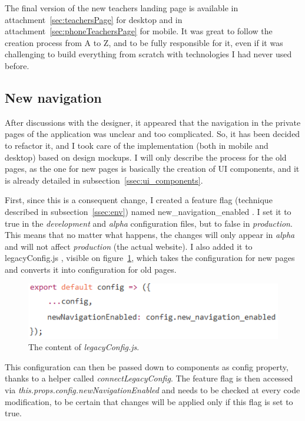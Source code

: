 The final version of the new teachers landing page is available in {\sc attachment}~\ref{sec:teachersPage} for desktop and in {\sc attachment}~\ref{sec:phoneTeachersPage} for mobile. It was great to follow the creation process from A to Z, and to be fully responsible for it, even if it was challenging to build everything from scratch with technologies I had never used before.

\subsection{New navigation}
\label{ssec:new_nav}

After discussions with the designer, it appeared that the navigation in the private pages of the application was unclear and too complicated. So, it has been decided to refactor it, and I took care of the implementation (both in mobile and desktop) based on design mockups. I will only describe the process for the old pages, as the one for new pages is basically the creation of UI components, and it is already detailed in {\sc subsection}~\ref{ssec:ui_components}.

First, since this is a consequent change, I created a feature flag (technique described in {\sc subsection}~\ref{ssec:env}) named \guillemotleft{} new\_navigation\_enabled \guillemotright{}. I set it to true in the \textit{development} and \textit{alpha} configuration files, but to false in \textit{production}. This means that no matter what happens, the changes will only appear in \textit{alpha} and will not affect \textit{production} (the actual website). I also added it to \guillemotleft{} legacyConfig.js \guillemotright{}, visible on {\sc figure}~\ref{fig:legacyConfig}, which takes the configuration for new pages and converts it into configuration for old pages.

\begin{figure}[H]
    \centering
    \includegraphics[scale=0.8]{figure/legacyConfig.png}
    \caption{The content of \textit{legacyConfig.js}.}
    \label{fig:legacyConfig}
\end{figure}

This configuration can then be passed down to components as \guillemotleft{} config \guillemotright{} property, thanks to a helper called \textit{connectLegacyConfig}. The feature flag is then accessed via \textit{this.props.config.newNavigationEnabled} and needs to be checked at every code modification, to be certain that changes will be applied only if this flag is set to true.

